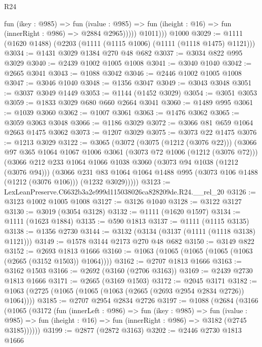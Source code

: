 \begin{lexlean}{R24}
\begin{coremodule}
                fun (ikey : @985) =>
                fun (ivalue : @985) =>
                fun (iheight : @16) => fun (innerRight : @986) => @2884 @2965)))))
          @1011)))
    @1000
@3029 := @1111 (@1620 @1488) (@2203 (@1111 (@1115 @1006) (@1111 (@1118 @1475) @1121)))
@3034 := @1431 @3029 @1384 @270 @48 @682
@3037 := @3034 @822 @995 @3029
@3040 := @2439 @1002 @1005 @1008
@3041 := @3040 @1040
@3042 := @2665 @3041
@3043 := @1088 @3042
@3046 := @2446 @1002 @1005 @1008
@3047 := @3046 @1040
@3048 := @1356 @3047
@3049 := @3043 @3048
@3051 := @3037 @3049 @1449
@3053 := @1144 (@1452 @3029)
@3054 := @3051 @3053
@3059 := @1833 @3029 @680 @660 @2664 @3041
@3060 := @1489 @995
@3061 := @1039 @3060
@3062 := @1007 @3061
@3063 := @1476 @3062
@3065 := @3059 @3063 @3048
@3066 := @1186 @3029
@3072 := @3066 @81 @659 @1064 @2663 @1475 @3062
@3073 := @1207 @3029
@3075 := @3073 @22 @1475
@3076 := @1213 @3029
@3122 := @3065
    (@3072
      (@3075 (@1212 (@3076 @22)))
      (@3066
        @97
        @365
        @1064
        @1067
        @1006
        @3061
        (@3073 @72 @1006 (@1212 (@3076 @72)))
        (@3066
          @212
          @233
          @1064
          @1066
          @1038
          @3060
          (@3073 @94 @1038 (@1212 (@3076 @94)))
          (@3066
            @231
            @83
            @1064
            @1064
            @1488
            @995
            (@3073 @106 @1488 (@1212 (@3076 @106)))
            (@1232 @3029)))))
@3123 := LexLeanPreserve.C6632b3a2e999d115038026ca828209de.R24.__rel_20
@3126 := @3123 @1002 @1005 @1008
@3127 := @3126 @1040
@3128 := @3122 @3127
@3130 := @3019 (@3054 @3128)
@3132 := @1111 (@1620 @1597)
@3134 := @1111 (@1623 @1884)
@3135 := @590 @1813
@3137 := @1111 (@1115 @3135)
@3138 := @1356 @2730
@3144 := @3132 (@3134 (@3137 (@1111 (@1118 @3138) @1121)))
@3149 := @1578 @3144 @2173 @270 @48 @682
@3150 := @3149 @822
@3152 := @2693 @1813 @1666
@3160 := @1063 (@1065 (@1065 (@1065 (@1063 (@2665 (@3152 @1503)) @1064))))
@3162 := @2707 @1813 @1666
@3163 := @3162 @1503
@3166 := @2692 (@3160 (@2706 @3163))
@3169 := @2439 @2730 @1813 @1666
@3171 := @2665 (@3169 @1503)
@3172 := @2045 @3171
@3182 := @1063 (@2725 (@1065 (@1065 (@1063 (@2665 (@2693 @2954 @2834 @2726)) @1064))))
@3185 := @2707 @2954 @2834 @2726
@3197 := @1088
    (@2684
      (@3166
        (@1065
          (@3172
            (fun (innerLeft : @986) =>
            fun (ikey : @985) =>
            fun (ivalue : @985) =>
            fun (iheight : @16) => fun (innerRight : @986) => @3182 (@2745 @3185))))))
@3199 := @2877 (@2872 @3163)
@3202 := @2446 @2730 @1813 @1666

\end{coremodule}
\end{lexlean}
